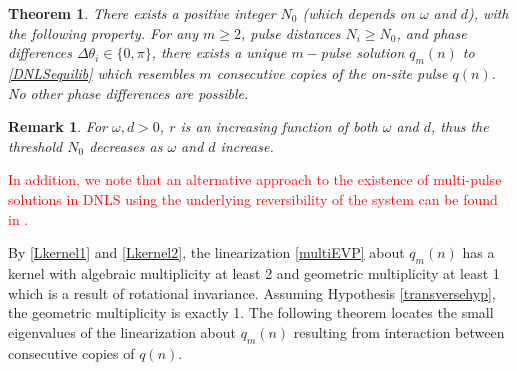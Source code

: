 \documentclass[12pt]{elsarticle}
\newtheorem{theorem}{Theorem}
\newtheorem{remark}{Remark}
\newcommand{\revised}[1]{ \textcolor{red}{#1} }
\begin{document}
\begin{theorem}\label{DNLSexisttheorem}
There exists a positive integer $N_0$ (which depends on $\omega$ and $d$), with the following property. For any $m \geq 2$, pulse distances $N_i \geq N_0$, and phase differences $\Delta\theta_i \in \{0, \pi\}$, there exists a unique $m-$pulse solution $q_m(n)$ to \cref{DNLSequilib} which resembles $m$ consecutive copies of the on-site pulse $q(n)$. No other phase differences are possible.
\end{theorem}

\begin{remark}
For $\omega, d > 0$, $r$ is an increasing function of both $\omega$ and $d$, thus the threshold $N_0$ decreases as $\omega$ and $d$ increase.
\end{remark}
\revised{In addition, we note that an alternative approach to the existence of multi-pulse solutions in DNLS using the underlying reversibility of the system can be found in \cite{Qin2007}.}

By \cref{Lkernel1} and \cref{Lkernel2}, the linearization \eqref{multiEVP} about $q_m(n)$ has a kernel with algebraic multiplicity at least 2 and geometric multiplicity at least 1 which is a result of rotational invariance. Assuming Hypothesis \ref{transversehyp}, the geometric multiplicity is exactly 1. The following theorem locates the small eigenvalues of the linearization about $q_m(n)$ resulting from interaction between consecutive copies of $q(n)$. 
\end{document}
